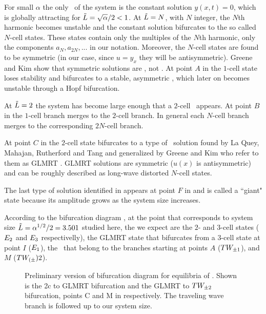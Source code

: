 For small $\alpha$ the only \eqv\ of the system is the constant solution $y(x,t)=0$,
which is globally attracting
for $\tilde{L}=\sqrt{\alpha}/2<1$. At $\tilde{L}=N$, with $N$ integer,
the $N$th harmonic becomes unstable and the constant solution
bifurcates to the so called $N$-cell states.
These states contain only the multiples of the $N$th
harmonic, {\ie} only the components $a_N,a_{2N},...$ in our notation.
Moreover, the $N$-cell states are found to be symmetric (in our case, since $u=y_x$ they will be
antisymmetric).
Greene and Kim show that symmetric solutions are \eqva, not \reqva.
At point $A$ in  the $1$-cell state loses stability
and bifurcates to a stable,
asymmetric \reqv, which later on becomes unstable through a Hopf bifurcation.

At $\tilde{L}=2$ the system has become large enough that a $2$-cell \eqv\ appears. At point $B$
in  the $1$-cell branch merges to the $2$-cell branch. In general each $N$-cell branch merges to the corresponding $2N$-cell branch.

At point $C$ in  the $2$-cell state bifurcates to a type of
\eqv\ solution
found by La Quey, Mahajan, Rutherford and Tang and generalized by Greene and Kim who refer to them as GLMRT \eqva. GLMRT solutions are symmetric
($u(x)$ is antisymmetric)
and can be roughly described as long-wave distorted $N$-cell states.

The last type of solution identified in  appears at point $F$
in  and is called a
``giant" state because its amplitude grows as the system size increases.

According to the bifurcation diagram ,
at the point that corresponds to system size $\tilde{L}=\alpha^{1/2}/2=3.501$
studied here,
the {\eqva} we expect are the $2$- and $3$-cell states ($E_{2}$ and $E_{3}$ respectivelly), the GLMRT state that bifurcates from a $3$-cell state at point $I$ ($E_{1}$),
the \reqva\ that belong to the branches starting at points $A$ ($TW_{\pm1}$),
and $M$ ($TW_{(\pm}){2}$).

\begin{figure}[t]
\centering
\caption{
    {\small
    Preliminary version of bifurcation diagram for equilibria of \KSe.  Shown is the 2c to GLMRT bifurcation and the GLMRT to $TW_{\pm2}$ bifurcation, points C and M in  respectively. The traveling wave branch is followed up to our system size.} %
        }
\label{fig:ksBifDiag}
\end{figure}

